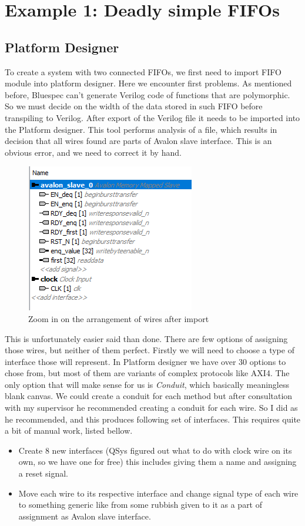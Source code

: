 \documentclass[12pt]{report}
\begin{document}
\section{Example 1: Deadly simple FIFOs}

\subsection{Platform Designer}
To create a system with two connected FIFOs, we first need to import FIFO module into platform designer. Here we encounter first problems. As mentioned before, Bluespec can't generate Verilog code of functions that are polymorphic. So we must decide on the width of the data stored in such FIFO before transpiling to Verilog. After export of the Verilog file it needs to be imported into the Platform designer. This tool performs analysis of a file, which results in decision that all wires found are parts of Avalon slave interface. This is an obvious error, and we need to correct it by hand.
\begin{figure}[H]
    \centering
    
    \includegraphics[width=0.5\columnwidth]{images/Example1BeforeOranization.png}
    \caption{Zoom in on the arrangement of wires after import}
\end{figure}
This is unfortunately easier said than done. There are few options of assigning those wires, but neither of them perfect. Firstly we will need to choose a type of interface those will represent. In Platform designer we have over 30 options to chose from, but most of them are variants of complex protocols like AXI4. The only option that will make sense for us is \emph{Conduit}, which basically meaningless blank canvas. We could create a conduit for each method but after consultation with my supervisor he recommended creating a conduit for each wire. So I did as he recommended, and this produces following set of interfaces. This requires quite a bit of manual work, listed bellow.
\begin{itemize}
    \item Create 8 new interfaces (QSys figured out what to do with clock wire on its own, so we have one for free) this includes giving them a name and assigning a reset signal.
    \item Move each wire to its respective interface and change signal type of each wire to something generic like  from some rubbish given to it as a part of assignment as Avalon slave interface. 
\end{itemize}
\end{document}
